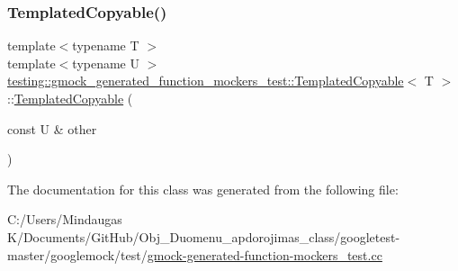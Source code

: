 \subsubsection{\texorpdfstring{TemplatedCopyable()}{TemplatedCopyable()}\hspace{0.1cm}{\footnotesize\ttfamily [4/4]}}
{\footnotesize\ttfamily template$<$typename T $>$ \\
template$<$typename U $>$ \\
\mbox{\hyperlink{classtesting_1_1gmock__generated__function__mockers__test_1_1_templated_copyable}{testing\+::gmock\+\_\+generated\+\_\+function\+\_\+mockers\+\_\+test\+::\+Templated\+Copyable}}$<$ T $>$\+::\mbox{\hyperlink{classtesting_1_1gmock__generated__function__mockers__test_1_1_templated_copyable}{Templated\+Copyable}} (\begin{DoxyParamCaption}\item[{const U \&}]{other }\end{DoxyParamCaption})\hspace{0.3cm}{\ttfamily [inline]}}



The documentation for this class was generated from the following file\+:\begin{DoxyCompactItemize}
\item 
C\+:/\+Users/\+Mindaugas K/\+Documents/\+Git\+Hub/\+Obj\+\_\+\+Duomenu\+\_\+apdorojimas\+\_\+class/googletest-\/master/googlemock/test/\mbox{\hyperlink{googletest-master_2googlemock_2test_2gmock-generated-function-mockers__test_8cc}{gmock-\/generated-\/function-\/mockers\+\_\+test.\+cc}}\end{DoxyCompactItemize}
